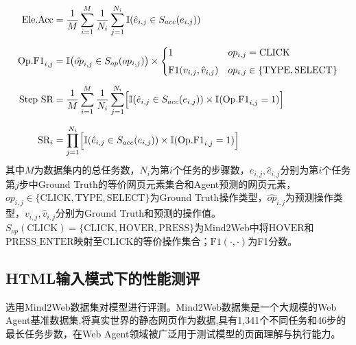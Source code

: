 \documentclass{SYSUReport}
\begin{document}
\begin{align*}
    \text{Ele.Acc} &= \frac{1}{M} \sum_{i=1}^{M} \frac{1}{N_i} \sum_{j=1}^{N_i} \mathbb{I}(\hat{e}_{i,j} \in S_{acc}(e_{i,j})) \\[6pt]
    \text{Op.F1}_{i,j} &= \mathbb{I}\bigl(\hat{op}_{i,j} \in S_{op}(op_{i,j})\bigr) \times
                         \begin{cases}
                            1 & op_{i,j} = \text{CLICK} \\[4pt]
                            \text{F1}(v_{i,j}, \hat{v}_{i,j}) & op_{i,j} \in \{\text{TYPE}, \text{SELECT}\}
                         \end{cases} \\[4pt]
    \text{Step SR} &= \frac{1}{M} \sum_{i=1}^{M} \frac{1}{N_i} \sum_{j=1}^{N_i} \Bigl[ \mathbb{I}(\hat{e}_{i,j} \in S_{acc}(e_{i,j})) \times \mathbb{I}(\text{Op.F1}_{i,j} = 1) \Bigr] \\[6pt]
    \text{SR}_i &= \prod_{j=1}^{N_i} \Bigl[ \mathbb{I}(\hat{e}_{i,j} \in S_{acc}(e_{i,j})) \times \mathbb{I}(\text{Op.F1}_{i,j} = 1) \Bigr]
\end{align*}
其中$M$为数据集内的总任务数，$N_{i}$为第$i$个任务的步骤数，$e_{i,j},\hat{e}_{i,j}$分别为第$i$个任务第$j$步中Ground Truth的等价网页元素集合和Agent预测的网页元素，$op_{i,j} \in \{\text{CLICK},\text{TYPE},\text{SELECT}\}$为Ground Truth操作类型，$\hat{op}_{i,j}$为预测操作类型，$v_{i,j},\hat{v}_{i,j}$分别为Ground Truth和预测的操作值。
$S_{op}(\text{CLICK})=\{\text{CLICK}, \text{HOVER}, \text{PRESS}\}$为Mind2Web中将$\text{HOVER}$和$\text{PRESS\_ENTER}$映射至$\text{CLICK}$的等价操作集合；$\text{F1}(\cdot,\cdot)$为F1分数。

\subsection{HTML输入模式下的性能测评}
选用Mind2Web数据集对模型进行评测。Mind2Web数据集是一个大规模的Web Agent基准数据集,将真实世界的静态网页作为数据,具有1,341个不同任务和46步的最长任务步数，在Web Agent领域被广泛用于测试模型的页面理解与执行能力。
\end{document}
